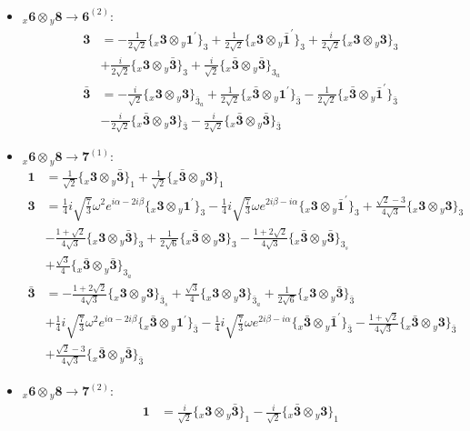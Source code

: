\documentclass[english]{article}
\newcommand{\rep}[1]{\mathbf{#1}}
\newcommand{\repx}[2]{{}_{#2}\mathbf{#1}}
\newcommand{\tsprodx}[2]{\repx{#1}{x}\otimes\repx{#2}{y}}
\newcommand{\subcgt}[3]{\big\{ \tsprodx{#1}{#2}\big\}^{}_{#3}}
\begin{document}
\begin{itemize}
\begin{align*}
\end{align*}
\item $\tsprodx{6}{8}\to\rep{6}^{(2)}$:
\begin{align*}
\rep{3} & = -\frac{1}{2 \sqrt{2}}\subcgt{3}{1^{\prime}}{3}+\frac{1}{2 \sqrt{2}}\subcgt{3}{\bar{1}^{\prime}}{3}+\frac{i}{2 \sqrt{2}}\subcgt{3}{3}{3} \\ 
 & +\frac{i}{2 \sqrt{2}}\subcgt{3}{\bar{3}}{3}+\frac{i}{\sqrt{2}}\subcgt{\bar{3}}{\bar{3}}{3_{a}}
\\
\rep{\bar{3}} & = -\frac{i}{\sqrt{2}}\subcgt{3}{3}{\bar{3}_{a}}+\frac{1}{2 \sqrt{2}}\subcgt{\bar{3}}{1^{\prime}}{\bar{3}}-\frac{1}{2 \sqrt{2}}\subcgt{\bar{3}}{\bar{1}^{\prime}}{\bar{3}} \\ 
 & -\frac{i}{2 \sqrt{2}}\subcgt{\bar{3}}{3}{\bar{3}}-\frac{i}{2 \sqrt{2}}\subcgt{\bar{3}}{\bar{3}}{\bar{3}}
\end{align*}
\item $\tsprodx{6}{8}\to\rep{7}^{(1)}$:
\begin{align*}
\rep{1} & = \frac{1}{\sqrt{2}}\subcgt{3}{\bar{3}}{1}+\frac{1}{\sqrt{2}}\subcgt{\bar{3}}{3}{1}
\\
\rep{3} & = \frac{1}{4} i \sqrt{\frac{7}{3}} \omega ^2 e^{i \alpha -2 i \beta }\subcgt{3}{1^{\prime}}{3}-\frac{1}{4} i \sqrt{\frac{7}{3}} \omega  e^{2 i \beta -i \alpha }\subcgt{3}{\bar{1}^{\prime}}{3}+\frac{\sqrt{2}-3}{4 \sqrt{3}}\subcgt{3}{3}{3} \\ 
 & -\frac{1+\sqrt{2}}{4 \sqrt{3}}\subcgt{3}{\bar{3}}{3}+\frac{1}{2 \sqrt{6}}\subcgt{\bar{3}}{3}{3}-\frac{1+2 \sqrt{2}}{4 \sqrt{3}}\subcgt{\bar{3}}{\bar{3}}{3_{s}} \\ 
 & +\frac{\sqrt{3}}{4}\subcgt{\bar{3}}{\bar{3}}{3_{a}}
\\
\rep{\bar{3}} & = -\frac{1+2 \sqrt{2}}{4 \sqrt{3}}\subcgt{3}{3}{\bar{3}_{s}}+\frac{\sqrt{3}}{4}\subcgt{3}{3}{\bar{3}_{a}}+\frac{1}{2 \sqrt{6}}\subcgt{3}{\bar{3}}{\bar{3}} \\ 
 & +\frac{1}{4} i \sqrt{\frac{7}{3}} \omega ^2 e^{i \alpha -2 i \beta }\subcgt{\bar{3}}{1^{\prime}}{\bar{3}}-\frac{1}{4} i \sqrt{\frac{7}{3}} \omega  e^{2 i \beta -i \alpha }\subcgt{\bar{3}}{\bar{1}^{\prime}}{\bar{3}}-\frac{1+\sqrt{2}}{4 \sqrt{3}}\subcgt{\bar{3}}{3}{\bar{3}} \\ 
 & +\frac{\sqrt{2}-3}{4 \sqrt{3}}\subcgt{\bar{3}}{\bar{3}}{\bar{3}}
\end{align*}
\item $\tsprodx{6}{8}\to\rep{7}^{(2)}$:
\begin{align*}
\rep{1} & = \frac{i}{\sqrt{2}}\subcgt{3}{\bar{3}}{1}-\frac{i}{\sqrt{2}}\subcgt{\bar{3}}{3}{1}

\end{align*}
\end{itemize}
\end{document}
